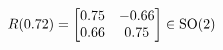 \documentclass[preview]{standalone}
\begin{document}
\begin{align*}
\special{dvisvgm:raw <g id='unique000'>}R(0.72) = \begin{bmatrix} 0.75 & -0.66 \\ 0.66 & 0.75 \end{bmatrix} \in \text{SO}(2)\special{dvisvgm:raw </g>}
\end{align*}
\end{document}
